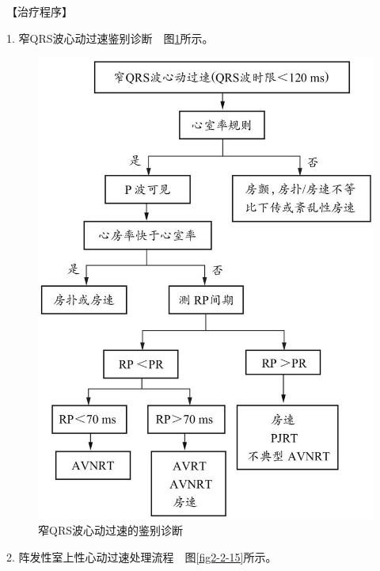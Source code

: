 【治疗程序】

1. 窄QRS波心动过速鉴别诊断　图\ref{fig2-2-14}所示。

\begin{figure}[!htbp]
 \centering
 \includegraphics{./images/Image00059.jpg}
 \captionsetup{justification=centering}
 \caption{窄QRS波心动过速的鉴别诊断}
 \label{fig2-2-14}
  \end{figure} 

2. 阵发性室上性心动过速处理流程　图\ref{fig2-2-15}所示。

